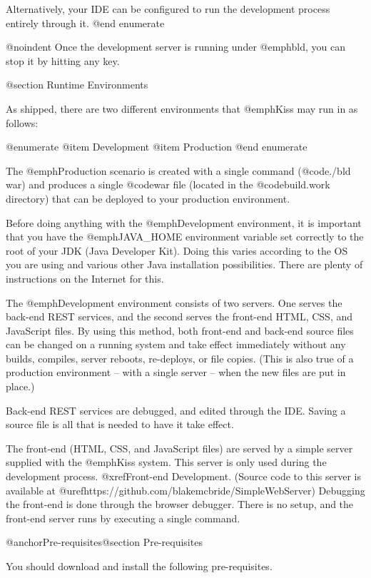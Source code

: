 Alternatively, your IDE can be configured to run the development
process entirely through it.
@end enumerate

@noindent Once the development server is running under @emph{bld}, you can stop it 
by hitting any key.

@section Runtime Environments

As shipped, there are two different environments that @emph{Kiss} may
run in as follows:

@enumerate
@item
Development
@item 
Production
@end enumerate

The @emph{Production} scenario is created with a single command
(@code{./bld war}) and produces a single @code{war} file (located in
the @code{build.work} directory) that can be deployed to your production
environment.

Before doing anything with the @emph{Development} environment, it is
important that you have the @emph{JAVA_HOME} environment variable set
correctly to the root of your JDK (Java Developer Kit).  Doing this
varies according to the OS you are using and various other Java
installation possibilities.  There are plenty of instructions on the
Internet for this.

The @emph{Development} environment consists of two servers.  One
serves the back-end REST services, and the second serves the front-end
HTML, CSS, and JavaScript files.  By using this method, both front-end
and back-end source files can be changed on a running system and take
effect immediately without any builds, compiles, server reboots,
re-deploys, or file copies.  (This is also true of a production
environment -- with a single server -- when the new files are put in place.)

Back-end REST services are debugged, and edited through the IDE.
Saving a source file is all that is needed to have it take effect.

The front-end (HTML, CSS, and JavaScript files) are served by a simple
server supplied with the @emph{Kiss} system.  This server is only used
during the development process.  @xref{Front-end Development}.
(Source code to this server is available at
@uref{https://github.com/blakemcbride/SimpleWebServer}) Debugging the
front-end is done through the browser debugger.  There is no setup,
and the front-end server runs by executing a single command.

@anchor{Pre-requisites}@section Pre-requisites

You should download and install the following pre-requisites.

